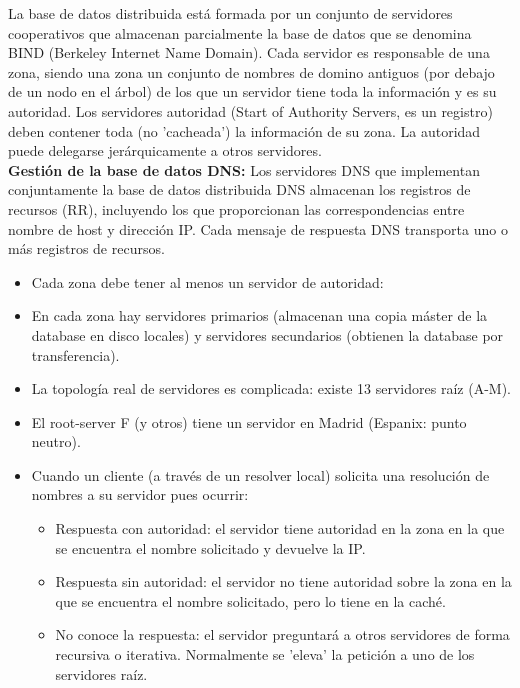 \documentclass[a4paper,11pt]{article}
\begin{document}
La base de datos distribuida está formada por un conjunto de servidores cooperativos que almacenan parcialmente la base de datos que se denomina BIND (Berkeley Internet Name Domain). Cada servidor es responsable de una zona, siendo una zona un conjunto de nombres de domino antiguos (por debajo de un nodo en el árbol) de los que un servidor tiene toda la información y es su autoridad. Los servidores autoridad (Start of Authority Servers, es un registro) deben contener toda (no 'cacheada') la información de su zona. La autoridad puede delegarse jerárquicamente a otros servidores. \\

\textbf{Gestión de la base de datos DNS:} 
Los servidores DNS que implementan conjuntamente la base de datos distribuida DNS almacenan los registros de recursos (RR), incluyendo los que proporcionan las correspondencias entre nombre de host y dirección IP. Cada mensaje de respuesta DNS transporta uno o más registros de recursos.

\begin{itemize}
\item Cada zona debe tener al menos un servidor de autoridad:
\item En cada zona hay servidores primarios (almacenan una copia máster de la database en disco locales) y servidores secundarios (obtienen la database por transferencia).
\item La topología real de servidores es complicada: existe 13 servidores raíz (A-M).
\item El root-server F (y otros) tiene un servidor en Madrid (Espanix: punto neutro).
\item Cuando un cliente (a través de un resolver local) solicita una resolución de nombres a su servidor pues ocurrir:
	\begin{itemize}
		\item Respuesta con autoridad: el servidor tiene autoridad en la zona en la que se encuentra el nombre solicitado y devuelve la IP.
		\item Respuesta sin autoridad: el servidor no tiene autoridad sobre la zona en la que se encuentra el nombre solicitado, pero lo tiene en la caché.
		\item No conoce la respuesta: el servidor preguntará a otros servidores de forma recursiva o iterativa. Normalmente se 'eleva' la petición a uno de los servidores raíz.
	\end{itemize}
\end{itemize}
\end{document}
